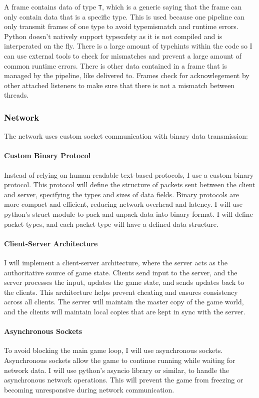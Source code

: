 \documentclass{article}
\begin{document}
\noindent A frame contains data of type \verb|T|, which is a generic saying that the frame can only contain data that is a specific type. This is used because one pipeline can only transmit frames of one type to avoid typemismatch and runtime errors. Python doesn't natively support typesafety as it is not compiled and is interperated on the fly. There is a large amount of typehints within the code so I can use external tools to check for mismatches and prevent a large amount of common runtime errors. There is other data contained in a frame that is managed by the pipeline, like delivered to. Frames check for acknowlegement by other attached listeners to make sure that there is not a mismatch between threads.

\subsubsection{Network}

The network uses custom socket communication with binary data transmission:

\paragraph{Custom Binary Protocol}
Instead of relying on human-readable text-based protocols, I use a custom binary protocol. This protocol will define the structure of packets sent between the client and server, specifying the types and sizes of data fields. Binary protocols are more compact and efficient, reducing network overhead and latency. I will use python's struct module to pack and unpack data into binary format. I will define packet types, and each packet type will have a defined data structure.

\paragraph{Client-Server Architecture}
I will implement a client-server architecture, where the server acts as the authoritative source of game state. Clients send input to the server, and the server processes the input, updates the game state, and sends updates back to the clients. This architecture helps prevent cheating and ensures consistency across all clients. The server will maintain the master copy of the game world, and the clients will maintain local copies that are kept in sync with the server.

\paragraph{Asynchronous Sockets}
To avoid blocking the main game loop, I will use asynchronous sockets. Asynchronous sockets allow the game to continue running while waiting for network data. I will use python's asyncio library or similar, to handle the asynchronous network operations. This will prevent the game from freezing or becoming unresponsive during network communication.
\end{document}
